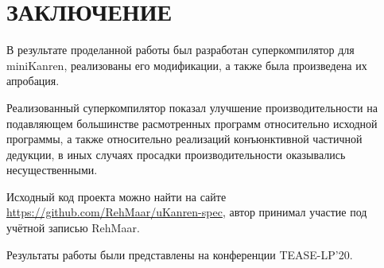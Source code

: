 \section*{ЗАКЛЮЧЕНИЕ}

В результате проделанной работы был разработан суперкомпилятор для miniKanren,
реализованы его модификации, а также была произведена их апробация.

Реализованный суперкомпилятор показал улучшение производительности на подавляющем
большинстве расмотренных программ относительно исходной программы, а также относительно
реализаций конъюнктивной частичной дедукции,
в иных случаях просадки производительности оказывались несущественными.

Исходный код проекта можно найти на сайте \url{https://github.com/RehMaar/uKanren-spec},
автор принимал участие под учётной записью RehMaar.

Результаты работы были представлены на конференции TEASE-LP'20.
